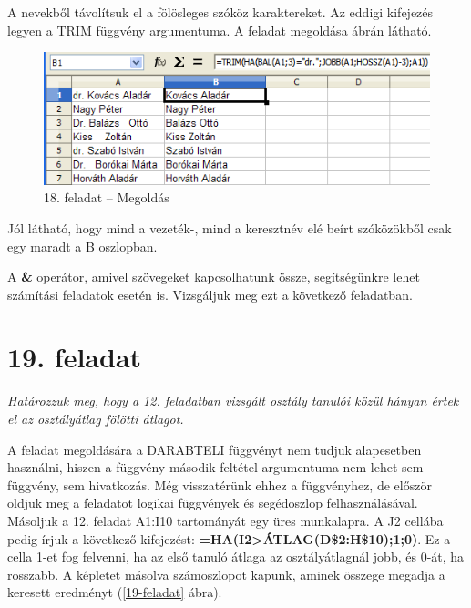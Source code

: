 A nevekből távolítsuk el a fölösleges szóköz
karaktereket. Az eddigi kifejezés legyen a TRIM függvény
argumentuma. A feladat megoldása  ábrán látható.

\begin{figure}[!h]
\begin{center}
\includegraphics[width=12.254cm]{oocalcv2-img92.png}
\caption{18. feladat -- Megoldás}\label{18-feladatMegoldás}
\end{center}
\end{figure}

Jól látható, hogy mind a vezeték-, mind a keresztnév elé
beírt szóközökből csak egy maradt a B oszlopban.

A \textbf{\&} operátor, amivel szövegeket kapcsolhatunk össze,
segítségünkre lehet számítási feladatok esetén is.
Vizsgáljuk meg ezt a következő feladatban.


\clearpage
\section{19. feladat}

{\itshape
Határozzuk meg, hogy a 12. feladatban vizsgált osztály tanulói
közül hányan értek el az osztályátlag fölötti átlagot.}

A feladat megoldására a DARABTELI függvényt nem tudjuk alapesetben
használni, hiszen a függvény második feltétel argumentuma nem
lehet sem függvény, sem hivatkozás. Még visszatérünk ehhez
a függvényhez, de először oldjuk meg a feladatot logikai
függvények és segédoszlop felhasználásával. Másoljuk a
12. feladat A1:I10 tartományát egy üres munkalapra. A J2
cellába pedig írjuk a következő kifejezést:
\textsf{\textbf{=HA(I2>ÁTLAG(D\$2:H\$10);1;0)}}.
Ez a cella 1-et fog felvenni, ha az első tanuló átlaga az
osztályátlagnál jobb, és 0-át, ha rosszabb. A képletet
másolva számoszlopot kapunk, aminek összege megadja a keresett
eredményt (\ref{19-feladat} ábra).

